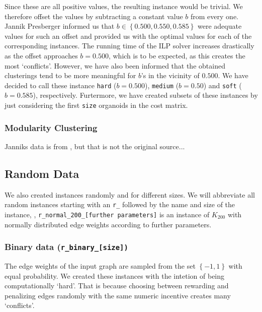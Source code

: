 Since these are all positive values, the resulting \CP instance would be trivial.
We therefore offset the values by subtracting a constant value $b$ from every one.
Jannik Presberger informed us that $b \in \left\{ 0.500, 0.550, 0.585 \right\}$ were adequate values for such an offset and provided us with the optimal values for each of the corresponding instances.
The running time of the ILP solver increases drastically as the offset approaches $b = 0.500$, which is to be expected, as this creates the most ‘conflicts’.
However, we have also been informed that the obtained clusterings tend to be more meaningful for $b$’s in the vicinity of $0.500$.
We have decided to call these instance \texttt{hard} ($b= 0.500$), \texttt{medium} ($b = 0.50$) and \texttt{soft} ($b = 0.585$), respectively.
Furtermore, we have created subsets of these instances by just considering the first \texttt{size} organoids in the cost matrix.



\subsubsection{Modularity Clustering}
Janniks data is from \cite{kappesComparativeStudyModern2015}, but that is not the original source...


\subsection{Random Data}\label{subsec:random_data}
We also created \CP instances randomly and for different sizes.
We will abbreviate all random instances starting with an \texttt{r\_} followed by the name and size of the instance,
\eg, \texttt{r\_normal\_200\_[further parameters]} is an instance of $K_{200}$ with normally distributed edge weights according to further parameters.

\subsubsection{Binary data (\texttt{r\_binary\_[size])}}\label{subsubsec:data_random_binary}
The edge weights of the input graph are sampled from the set $\left\{ -1, 1 \right\}$ with equal probability.
We created these instances with the intetion of being computationally ‘hard’.
That is because choosing between rewarding and penalizing edges randomly with the same numeric incentive creates many ‘conflicts’.

